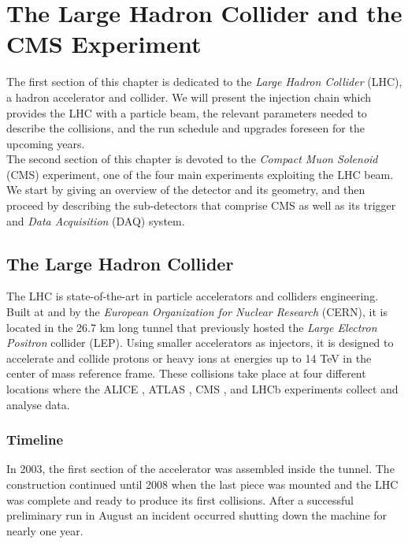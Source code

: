 \chapter{The Large Hadron Collider and the CMS Experiment}
\label{chap:lhc_cms}

    The first section of this chapter is dedicated to the \emph{Large Hadron Collider} (LHC), a hadron accelerator and collider. We will present the injection chain which provides the LHC with a particle beam, the relevant parameters needed to describe the collisions, and the run schedule and upgrades foreseen for the upcoming years. \\

    The second section of this chapter is devoted to the \emph{Compact Muon Solenoid} (CMS) experiment, one of the four main experiments exploiting the LHC beam. We start by giving an overview of the detector and its geometry, and then proceed by describing the sub-detectors that comprise CMS as well as its trigger and \emph{Data Acquisition} (DAQ) system.

    \section{The Large Hadron Collider}

        The LHC \Cite{Evans:1129806} is state-of-the-art in particle accelerators and colliders engineering. Built at and by the \emph{European Organization for Nuclear Research} (CERN), it is located in the 26.7 km long tunnel that previously hosted the \emph{Large Electron Positron} collider (LEP). Using smaller accelerators as injectors, it is designed to accelerate and collide protons or heavy ions at energies up to 14 TeV in the center of mass reference frame. These collisions take place at four different locations where the ALICE \Cite{1748-0221-3-08-S08002}, ATLAS \Cite{1748-0221-3-08-S08003}, CMS \Cite{1748-0221-3-08-S08004}, and LHCb \Cite{1748-0221-3-08-S08005} experiments collect and analyse data.

        \subsection{Timeline}

            In 2003, the first section of the accelerator was assembled inside the tunnel. The construction continued until 2008 when the last piece was mounted and the LHC was complete and ready to produce its first collisions. After a successful preliminary run in August an incident occurred shutting down the machine for nearly one year. \\

